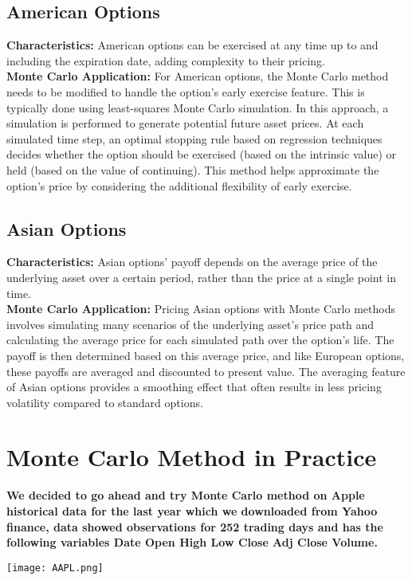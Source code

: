 \documentclass{article}
\begin{document}
\subsection{American Options}
\textbf{Characteristics:} American options can be exercised at any time up to and including the expiration date, adding complexity to their pricing.\\
\textbf{Monte Carlo Application:} For American options, the Monte Carlo method needs to be modified to handle the option's early exercise feature. This is typically done using least-squares Monte Carlo simulation. In this approach, a simulation is performed to generate potential future asset prices. At each simulated time step, an optimal stopping rule based on regression techniques decides whether the option should be exercised (based on the intrinsic value) or held (based on the value of continuing). This method helps approximate the option's price by considering the additional flexibility of early exercise.

\subsection{Asian Options}
\textbf{Characteristics:} Asian options' payoff depends on the average price of the underlying asset over a certain period, rather than the price at a single point in time.\\
\textbf{Monte Carlo Application:} Pricing Asian options with Monte Carlo methods involves simulating many scenarios of the underlying asset's price path and calculating the average price for each simulated path over the option's life. The payoff is then determined based on this average price, and like European options, these payoffs are averaged and discounted to present value. The averaging feature of Asian options provides a smoothing effect that often results in less pricing volatility compared to standard options.

\newpage
\section{Monte Carlo Method in Practice}

\textbf{We decided to go ahead and try Monte Carlo method on Apple historical data for the last year which we downloaded from Yahoo finance, data showed observations for 252 trading days and has the following variables Date	Open	High	Low	Close	Adj Close	Volume.}

\noindent
\texttt{[image: AAPL.png]}
\end{document}
